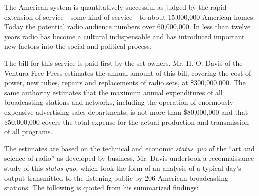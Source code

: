 \documentclass[openany,nobib]{tufte-book}
\begin{document}
The American system is quantitatively successful as judged by the rapid
extension of service---some kind of service---to about 15,000,000
American homes. Today the potential radio audience numbers over
60,000,000. In less than twelve years radio has become a cultural
indispensable and has introduced important new factors into the social
and political process.

The bill for this service is paid first by the set owners. Mr. H. O.
Davis of the Ventura Free Press estimates the annual amount of this
bill, covering the cost of power, new tubes, repairs and replacements of
radio sets, at \$300,000,000. The same authority estimates that the
maximum annual expenditures of all broadcasting stations and networks,
including the operation of enormously expensive advertising sales
departments, is not more than \$80,000,000 and that \$50,000,000 covers
the total expense for the actual production and transmission of all
programs.

The estimates are based on the technical and economic \emph{status quo}
of the ``art and science of radio'' as developed by business. Mr. Davis
undertook a reconnaissance study of this \emph{status quo}, which took
the form of an analysis of a typical day's output transmitted to the
listening public by 206 American broadcasting stations. The following is
quoted from his summarized findings:
\end{document}
